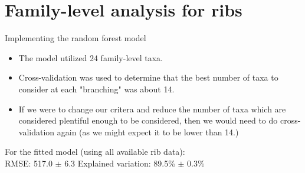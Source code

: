 \documentclass{beamer}
\begin{document}
\section[Ribs, family-level]{Family-level analysis for ribs}

\begin{frame}{Implementing the random forest model}

\begin{itemize}
\item The model utilized 24 family-level taxa.
\item Cross-validation was used to determine that the best number of taxa to
consider at each "branching" was about 14.
\item If we were to change our critera and reduce the number of taxa which are
considered plentiful enough to be considered, then we would need to do
cross-validation again (as we might expect it to be lower than 14.)
\end{itemize}

\vspace{0.1in}

\noindent For the fitted model (using all available rib data):\\
\noindent RMSE: 517.0 $\pm$ 6.3  \hspace{0.05in}  Explained variation: 89.5\%
$\pm$ 0.3\%


\end{frame}
\end{document}
